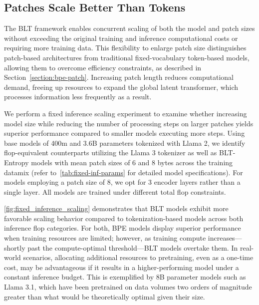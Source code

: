 \subsection{Patches Scale Better Than Tokens} The {\textsc BLT} framework enables concurrent scaling of both the model and patch sizes without exceeding the original training and inference computational costs or requiring more training data. This flexibility to enlarge patch size distinguishes patch-based architectures from traditional fixed-vocabulary token-based models, allowing them to overcome efficiency constraints, as described in Section~\ref{section:bpe-patch}. Increasing patch length reduces computational demand, freeing up resources to expand the global latent transformer, which processes information less frequently as a result.

We perform a fixed inference scaling experiment to examine whether increasing model size while reducing the number of processing steps on larger patches yields superior performance compared to smaller models executing more steps. Using base models of 400m and 3.6B parameters tokenized with Llama 2, we identify flop-equivalent counterparts utilizing the Llama 3 tokenizer as well as {\textsc BLT}-Entropy models with mean patch sizes of 6 and 8 bytes across the training datamix (refer to~\autoref{tab:fixed-inf-params} for detailed model specifications). For models employing a patch size of 8, we opt for 3 encoder layers rather than a single layer. All models are trained under different total flop constraints.

\autoref{fig:fixed_inference_scaling} demonstrates that {\textsc BLT} models exhibit more favorable scaling behavior compared to tokenization-based models across both inference flop categories. For both, BPE models display superior performance when training resources are limited; however, as training compute increases—shortly past the compute-optimal threshold—{\textsc BLT} models overtake them. In real-world scenarios, allocating additional resources to pretraining, even as a one-time cost, may be advantageous if it results in a higher-performing model under a constant inference budget. This is exemplified by 8B parameter models such as Llama 3.1, which have been pretrained on data volumes two orders of magnitude greater than what would be theoretically optimal given their size.

